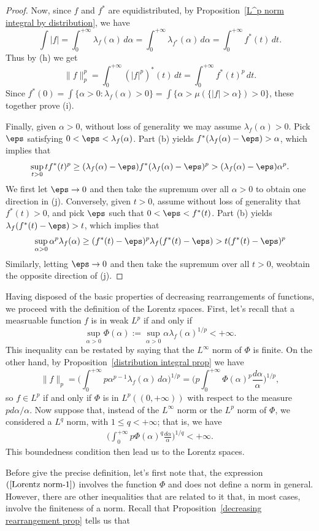 \begin{proof}
Now, since $f$ and $f^*$ are equidistributed, by Proposition~\ref{L^p norm integral by distribution}, we have
\[\int|f|=\int_{0}^{+\infty}\lambda_{f}(\alpha)\,d\alpha=\int_{0}^{+\infty}\lambda_{f^*}(\alpha)\,d\alpha=\int_{0}^{+\infty}f^*(t)\,dt.\]
Thus by (h) we get
\[\|f\|_p^p=\int_{0}^{+\infty}(|f|^p)^*(t)\,dt=\int_{0}^{+\infty}f^*(t)^p\,dt.\]
Since $f^*(0)=\int\{\alpha>0:\lambda_f(\alpha)>0\}=\int\{\alpha>\mu(\{|f|>\alpha\})>0\}$, these together prove (i).\par
Finally, given $\alpha>0$, without loss of generality we may assume $\lambda_f(\alpha)>0$. Pick $\eps$ satisfying $0<\eps<\lambda_f(\alpha)$. Part (b) yields $f^*(\lambda_f(\alpha)-\eps)>\alpha$, which implies that
\[\sup_{t>0}tf^*(t)^p\geq (\lambda_f(\alpha)-\eps)f^*(\lambda_f(\alpha)-\eps)^p>(\lambda_f(\alpha)-\eps)\alpha^p.\]
We first let $\eps\to 0$ and then take the supremum over all $\alpha>0$ to obtain one direction in (j). Conversely, given $t>0$, assume without loss of generality that $f^*(t)>0$, and pick $\eps$ such that $0<\eps<f^*(t)$. Part (b) yields $\lambda_f(f^*(t)-\eps)>t$, which implies that
\[\sup_{\alpha>0}\alpha^p\lambda_f(\alpha)\geq(f^*(t)-\eps)^p\lambda_f(f^*(t)-\eps)>t(f^*(t)-\eps)^p\]
Similarly, letting $\eps\to 0$ and then take the supremum over all $t>0$, weobtain the opposite direction of (j).
\end{proof}
Having disposed of the basic properties of decreasing rearrangements of functions, we proceed with the definition of the Lorentz spaces. First, let's recall that a measruable function $f$ is in weak $L^p$ if and only if
\[\sup_{\alpha>0}\Phi(\alpha):=\sup_{\alpha>0}\alpha\lambda_f(\alpha)^{1/p}<+\infty.\]
This inequality can be restated by saying that the $L^\infty$ norm of $\Phi$ is finite. On the other hand, by Proposition~\ref{distribution integral prop} we have
\[\|f\|_p=\Big(\int_{0}^{+\infty}p\alpha^{p-1}\lambda_f(\alpha)\,d\alpha\Big)^{1/p}=\Big(p\int_{0}^{+\infty}\Phi(\alpha)^p\frac{d\alpha}{\alpha}\Big)^{1/p},\]
so $f\in L^p$ if and only if $\Phi$ is in $L^p((0,+\infty))$ with respect to the measure $pd\alpha/\alpha$. Now suppose that, instead of the $L^\infty$ norm or the $L^p$ norm of $\Phi$, we considered a $L^q$ norm, with $1\leq q<+\infty$; that is, we have
\begin{align}\label{Lorentz norm-1}
\Big(\int_{0}^{+\infty}p\Phi(\alpha)^q\frac{d\alpha}{\alpha}\Big)^{1/q}<+\infty.
\end{align}
This boundedness condition then lead us to the Lorentz spaces.\par
Before give the precise definition, let's first note that, the expression $(\ref{Lorentz norm-1})$ involves the function $\Phi$ and does not define a norm in general. However, there are other inequalities that are related to it that, in most cases, involve the finiteness of a norm. Recall that Proposition~\ref{decreasing rearrangement prop} tells us that
